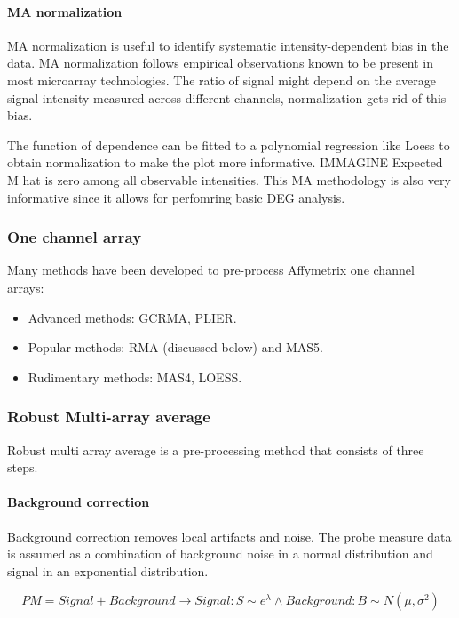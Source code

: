 			\paragraph{MA normalization}
			MA normalization is useful to identify systematic intensity-dependent bias in the data.
			MA normalization follows empirical observations known to be present in most microarray technologies.
			The ratio of signal might depend on the average signal intensity measured across different channels, normalization gets rid of this bias.
			
			The function of dependence can be fitted to a polynomial regression like Loess to obtain normalization to make the plot more informative. 
			IMMAGINE
			Expected M hat is zero among all observable intensities.
			This MA methodology is also very informative since it allows for perfomring basic DEG analysis. 

		\subsubsection{One channel array}
		Many methods have been developed to pre-process Affymetrix one channel arrays:

		\begin{multicols}{3}
			\begin{itemize}
				\item Advanced methods: GCRMA, PLIER.
				\item Popular methods: RMA (discussed below) and MAS5.
				\item Rudimentary methods: MAS4, LOESS.
			\end{itemize}
		\end{multicols}

		\subsubsection{Robust Multi-array average}
		Robust multi array average is a pre-processing method that consists of three steps.

			\paragraph{Background correction}
			Background correction removes local artifacts and noise.
			The probe measure data is assumed as a combination of background noise in a normal distribution and signal in an exponential distribution.
			
			$$PM = Signal + Background \rightarrow Signal: S \sim e^\lambda \land Background : B\sim N(\mu, \sigma^2)$$

